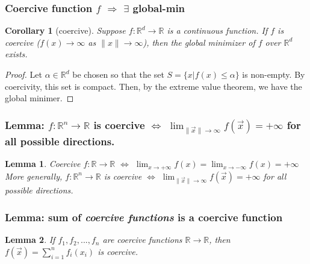 \documentclass[11pt,a4paper]{article}
\newtheorem{lemma}{Lemma}
\newtheorem{corollary}{Corollary}
\begin{document}
\subsubsection{Coercive function $f$ $\Rightarrow$ $\exists$ global-min}
\begin{corollary}[coercive]
    Suppose $f: \mathbb{R}^{d} \rightarrow \mathbb{R}$ is a continuous function. If $f$ is coercive ($f(x) \rightarrow \infty$ as $\|x\| \rightarrow \infty$), then the global minimizer of $f$ over $\mathbb{R}^{d}$ exists.
\end{corollary}
\begin{proof}
Let $\alpha\in \mathbb{R}^d$ be chosen so that the set $S = \{x |f(x) \leq \alpha\}$ is non-empty. By coercivity,
this set is compact. Then, by the extreme value theorem, we have the global minimer.
\end{proof}

\subsubsection{Lemma: $f: \mathbb{R}^n \rightarrow  \mathbb{R}$ is coercive $\Leftrightarrow$ $\lim_{\|\vec{x}\| \rightarrow \infty}f(\vec{x})=+\infty$ for all possible directions.}
\begin{lemma}
    Coercive $f: \mathbb{R} \rightarrow \mathbb{R}$ $\Leftrightarrow$ $\lim_{x \rightarrow +\infty}f(x)=\lim_{x \rightarrow -\infty}f(x)=+\infty$\\
    More generally, $f: \mathbb{R}^n \rightarrow  \mathbb{R}$ is coercive $\Leftrightarrow$ $\lim_{\|\vec{x}\| \rightarrow \infty}f(\vec{x})=+\infty$ for all possible directions.
\end{lemma}

\subsubsection{Lemma: sum of \textit{coercive functions} is a coercive function}
\begin{lemma}
    If $f_1,f_2,...,f_n$ are coercive functions $\mathbb{R} \rightarrow  \mathbb{R}$, then $f(\vec{x})=\sum_{i=1}^n f_i(x_i)$ is coercive.
\end{lemma}
\end{document}
